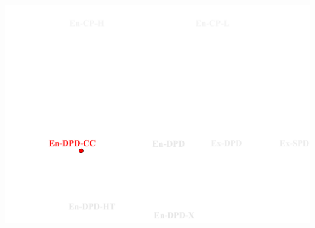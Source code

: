 \documentclass{beamer}
\begin{document}
\begin{frame}
\begin{card}
\begin{center}
\includegraphics[height=0.7\textwidth]{./i/FlowChart1.pdf}
\end{center}
\end{card}
\end{frame}
\end{document}
